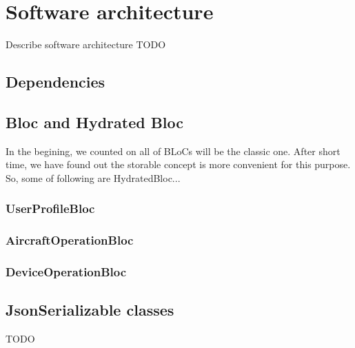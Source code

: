 \chapter{Software architecture}\label{ch:software-architecture}
Describe software architecture
TODO
\section{Dependencies}\label{sec:dependencies}

\section{Bloc and Hydrated Bloc}\label{sec:bloc-and-hydrated-bloc}
In the begining, we counted on all of BLoCs will be the classic one.
After short time, we have found out the storable concept is more convenient for this purpose.
So, some of following are HydratedBloc...

\subsection{UserProfileBloc}\label{subsec:userprofilebloc}

\subsection{AircraftOperationBloc}\label{subsec:aircraftoperationbloc}

\subsection{DeviceOperationBloc}\label{subsec:deviceoperationbloc}


\section{JsonSerializable classes}\label{sec:jsonserializable-classes}


TODO